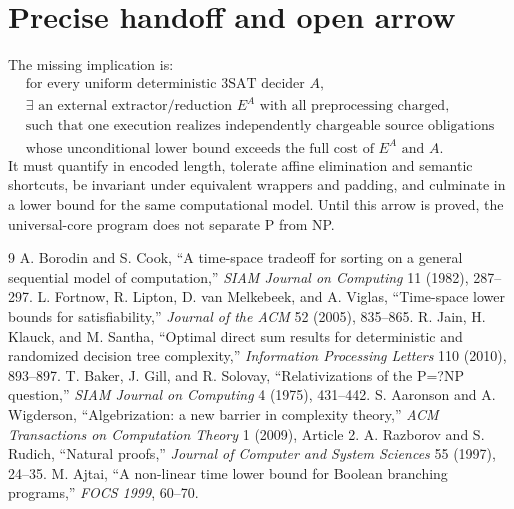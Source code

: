 \documentclass[11pt]{article}
\begin{document}
\section{Precise handoff and open arrow}

The missing implication is:
\[
\begin{gathered}
\text{for every uniform deterministic 3SAT decider }A,\\
\exists\text{ an external extractor/reduction }E^A\text{ with all preprocessing charged,}\\
\text{such that one execution realizes independently chargeable source obligations}\\
\text{whose unconditional lower bound exceeds the full cost of }E^A\text{ and }A.
\end{gathered}
\]
It must quantify in encoded length, tolerate affine elimination and semantic shortcuts, be invariant under equivalent wrappers and padding, and culminate in a lower bound for the same computational model.  Until this arrow is proved, the universal-core program does not separate P from NP.

\begin{thebibliography}{9}
 A. Borodin and S. Cook, ``A time-space tradeoff for sorting on a general sequential model of computation,'' \emph{SIAM Journal on Computing} 11 (1982), 287--297.
 L. Fortnow, R. Lipton, D. van Melkebeek, and A. Viglas, ``Time-space lower bounds for satisfiability,'' \emph{Journal of the ACM} 52 (2005), 835--865.
 R. Jain, H. Klauck, and M. Santha, ``Optimal direct sum results for deterministic and randomized decision tree complexity,'' \emph{Information Processing Letters} 110 (2010), 893--897.
 T. Baker, J. Gill, and R. Solovay, ``Relativizations of the P=?NP question,'' \emph{SIAM Journal on Computing} 4 (1975), 431--442.
 S. Aaronson and A. Wigderson, ``Algebrization: a new barrier in complexity theory,'' \emph{ACM Transactions on Computation Theory} 1 (2009), Article 2.
 A. Razborov and S. Rudich, ``Natural proofs,'' \emph{Journal of Computer and System Sciences} 55 (1997), 24--35.
 M. Ajtai, ``A non-linear time lower bound for Boolean branching programs,'' \emph{FOCS 1999}, 60--70.
\end{thebibliography}

\end{document}
